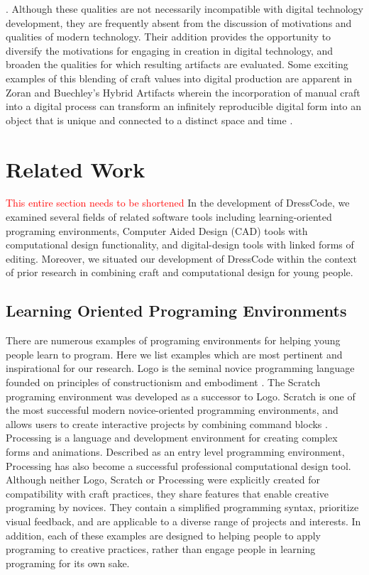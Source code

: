 \documentclass{sigchi}
\begin{document}
\cite{pye}. Although these qualities are not necessarily incompatible with digital technology development, they are frequently absent from the discussion of motivations and qualities of modern technology. Their addition provides the opportunity to diversify the motivations for engaging in creation in digital technology, and broaden the qualities for which resulting artifacts are evaluated. Some exciting examples of this blending of craft values into digital production are apparent in Zoran and Buechley's Hybrid Artifacts wherein the incorporation of manual craft into a digital process can transform an infinitely reproducible digital form into an object that is unique and connected to a distinct space and time \cite{zoran}.



\section{Related Work}
\textcolor{red}{This entire section needs to be shortened}
In the development of DressCode, we examined several fields of related software tools including learning-oriented programing environments, Computer Aided Design (CAD) tools with computational design functionality, and digital-design tools with linked forms of editing. Moreover, we situated our development of DressCode within the context of prior research in combining craft and computational design for young people.

\subsection{Learning Oriented Programing Environments}
There are numerous examples of programing environments for helping young people learn to program. Here we list examples which are most pertinent and inspirational for our research. Logo is the seminal novice programming language founded on principles of constructionism and embodiment \cite{papert}. The Scratch programing environment was developed as a successor to Logo. Scratch is one of the most successful modern novice-oriented programming environments, and allows users to create interactive projects by combining command blocks \cite{resnick2}. Processing is a language and development environment for creating complex forms and animations. Described as an entry level programming environment, Processing has also become a successful professional computational design tool\cite{processing}. Although neither Logo, Scratch or Processing were explicitly created for compatibility with craft practices, they share features that enable creative programing by novices. They contain a simplified programming syntax, prioritize visual feedback, and are applicable to a diverse range of projects and interests. In addition, each of these examples are designed to helping people to apply programing to creative practices, rather than engage people in learning programing for its own sake. 
\end{document}
